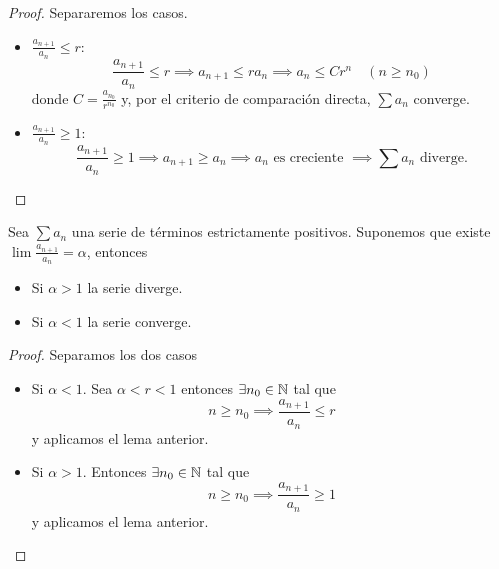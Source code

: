 \begin{proof}
    Separaremos los casos.
    \begin{itemize}
        \item $\frac{a_{n+1}}{a_n} \leq r$:
        \[
            \frac{a_{n+1}}{a_n} \leq r \implies a_{n+1} \leq r a_n \implies a_n \leq
            C r^n \quad (n \geq n_0)
        \]
        donde $C = \frac{a_{n_0}}{r^{n_0}}$ y, por el criterio de comparación
        directa, $\sum a_n$ converge.
        \item $\frac{a_{n+1}}{a_n} \geq 1$: 
            \[
                \frac{a_{n+1}}{a_n} \geq 1\implies a_{n+1} \geq a_n \implies a_n\text{ es creciente }\implies \sum a_n\text{ diverge}.
            \]
    \end{itemize}
\end{proof}

\begin{prop}
    Sea $\sum a_n$ una serie de términos estrictamente positivos. Suponemos que existe
    $\lim \frac{a_{n+1}}{a_n} = \alpha$, entonces
    \begin{itemize}
        \item Si $\alpha > 1$ la serie diverge.
        \item Si $\alpha < 1$ la serie converge.
    \end{itemize}
\end{prop}

\begin{proof}
    Separamos los dos casos
    \begin{itemize}
        \item Si $\alpha < 1$. Sea $\alpha < r < 1$ entonces $\exists n_0 \in \mathbb{N}$
        tal que
        \[
            n \geq n_0 \implies \frac{a_{n+1}}{a_n} \leq r
        \]
        y aplicamos el lema anterior.
        \item Si $\alpha > 1$. Entonces  $\exists n_0 \in \mathbb{N}$ tal que
        \[
            n \geq n_0 \implies \frac{a_{n+1}}{a_n} \geq 1
        \]
        y aplicamos el lema anterior.
    \end{itemize}
\end{proof}

